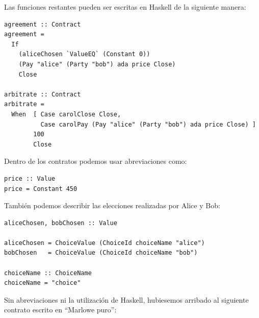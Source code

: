 \documentclass[12pt]{book}
\begin{document}
Las funciones restantes pueden ser escritas en Haskell de la siguiente manera:

\begin{lstlisting}[style=Haskell-cardano, language=Marlowe, caption=Funciones \texttt{agreement} y \texttt{arbitrate}.]
agreement :: Contract
agreement =
  If
    (aliceChosen `ValueEQ` (Constant 0))
    (Pay "alice" (Party "bob") ada price Close)
    Close

arbitrate :: Contract
arbitrate =
  When  [ Case carolClose Close,
          Case carolPay (Pay "alice" (Party "bob") ada price Close) ]
        100
        Close
\end{lstlisting}

Dentro de los contratos podemos usar abreviaciones como:

\begin{lstlisting}[style=Haskell-cardano, language=Marlowe, caption=Funcion \texttt{price}.]
price :: Value
price = Constant 450
\end{lstlisting}


También podemos describir las elecciones realizadas por Alice y Bob:

\begin{lstlisting}[style=Haskell-cardano, language=Marlowe, caption=Definicion de las elecciones.]
aliceChosen, bobChosen :: Value

aliceChosen = ChoiceValue (ChoiceId choiceName "alice")
bobChosen   = ChoiceValue (ChoiceId choiceName "bob")

choiceName :: ChoiceName
choiceName = "choice"
\end{lstlisting}

Sin abreviaciones ni la utilización de Haskell, hubiesemos arribado al siguiente contrato escrito en ``Marlowe puro'':
\end{document}
